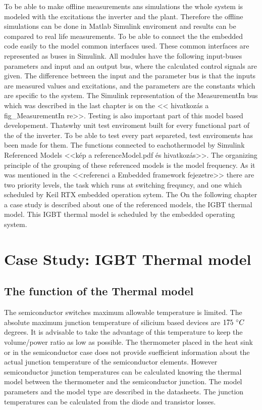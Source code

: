 To be able to make offline measurements ans simulations the whole system is modeled with the excitations the inverter and the plant. Therefore the offline simulations can be done in Matlab Simulink enviroment and results can be compared to real life measurements. To be able to connect the the embedded code easily to the model common interfaces used. These common interfaces are represented as buses in Simulink. All modules have the following input-buses parameters and input and an output bus, where the calculated control signals are given. The difference between the input and the parameter bus is that the inputs are measured values and excitations, and the parameters are the constants which are specific to the system. The Simulink representation of the MeasurementIn bus which was described in the last chapter is on the << hivatkozás a fig_MeasurementIn re>>. Testing is also important part of this model based developement. Thatswhy unit test enviroment built for every functional part of the of the inverter. To be able to test every part separeted, test enviroments has been made for them. The functions connected to eachothermodel by Simulink Referenced Models <<kép a referenceModel.pdf és hivatkozás>>. The organizing principle of the grouping of these referenced models is the model frequency. As it was  mentioned in the <<referenci a Embedded framework fejezetre>> there are two priority levels, the task which runs at switching frequncy, and one which scheduled by Keil RTX embedded operation sytem. The  On the following chapter a case study is described about one of the referenced models, the IGBT thermal model. This IGBT thermal model is scheduled by the embedded operating system. 


\section{Case Study: IGBT Thermal model}

\subsection{The function of the Thermal model}
The semiconductor switches maximum allowable temperature is limited. The absolute maximum junction temperature of silicium based devices  are $175\ \degree{}C$ degrees. It is advisable to take the advantage of this temperature to keep the volume/power ratio as low as possible. The thermometer placed in the heat sink or in the semiconductor case does not provide suefficient information about the actual junction temperature of the semiconductor elements. However semiconductor junction temperatures can be calculated knowing the thermal model between the thermometer and the semiconductor junction. The model parameters and the model type are described in the datasheets. The junction temperatures can be calculated from the diode and transistor losses.


